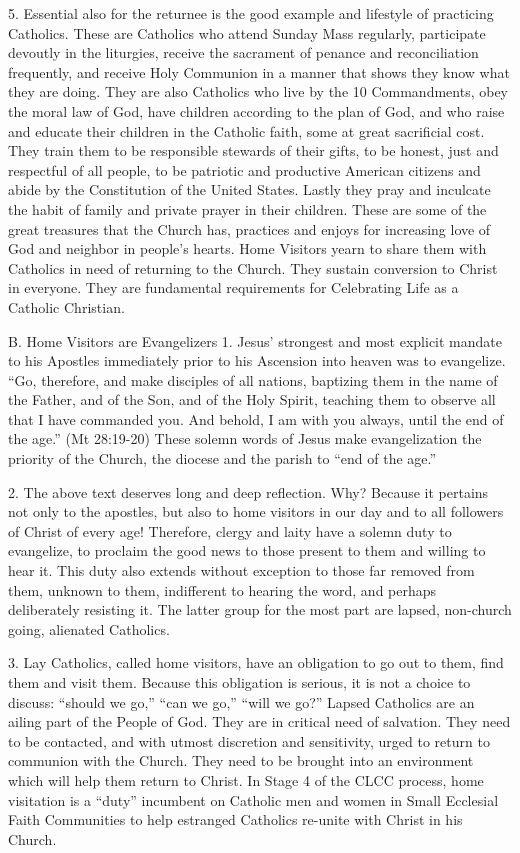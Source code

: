\documentclass[oneside]{book}
\begin{document}
5. Essential also for the returnee is the good example and lifestyle of
practicing Catholics. These are Catholics who attend Sunday Mass regularly,
participate devoutly in the liturgies, receive the sacrament of penance and
reconciliation frequently, and receive Holy Communion in a manner that shows
they know what they are doing. They are also Catholics who live by the 10
Commandments, obey the moral law of God, have children according to the plan of
God, and who raise and educate their children in the Catholic faith, some at
great sacrificial cost. They train them to be responsible stewards of their
gifts, to be honest, just and respectful of all people, to be patriotic and
productive American citizens and abide by the Constitution of the United
States. Lastly they pray and inculcate the habit of family and private prayer in
their children.
These are some of the great treasures that the Church has, practices and enjoys
for increasing love of God and neighbor in people's hearts. Home Visitors yearn
to share them with Catholics in need of returning to the Church. They sustain
conversion to Christ in everyone. They are fundamental requirements for
Celebrating Life as a Catholic Christian.

B. Home Visitors are Evangelizers
1. Jesus' strongest and most explicit mandate to his Apostles immediately prior
to his Ascension into heaven was to evangelize. ``Go, therefore, and make
disciples of all nations, baptizing them in the name of the Father, and of the
Son, and of the Holy Spirit, teaching them to observe all that I have commanded
you. And behold, I am with you always, until the end of the age.'' (Mt 28:19-20)
These solemn words of Jesus make evangelization the priority of the Church, the
diocese and the parish to ``end of the age.''

2. The above text deserves long and deep reflection. Why? Because it pertains
not only to the apostles, but also to home visitors in our day and to all
followers of Christ of every age! Therefore, clergy and laity have a solemn duty
to evangelize, to proclaim the good news to those present to them and willing to
hear it. This duty also extends without exception to those far removed from
them, unknown to them, indifferent to hearing the word, and perhaps deliberately
resisting it. The latter group for the most part are lapsed, non-church going,
alienated Catholics.

3. Lay Catholics, called home visitors, have an obligation to go out to them,
find them and visit them. Because this obligation is serious, it is not a choice
to discuss: ``should we go,'' ``can we go,'' ``will we go?'' Lapsed Catholics
are an ailing part of the People of God. They are in critical need of
salvation. They need to be contacted, and with utmost discretion and
sensitivity, urged to return to communion with the Church. They need to be
brought into an environment which will help them return to Christ. In Stage 4 of
the CLCC process, home visitation is a ``duty'' incumbent on Catholic men and
women in Small Ecclesial Faith Communities to help estranged Catholics re-unite
with Christ in his Church.
\end{document}
